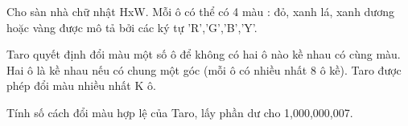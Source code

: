 Cho sàn nhà chữ nhật HxW. Mỗi ô có thể có 4 màu : đỏ, xanh lá, xanh dương hoặc vàng được mô tả bởi các ký tự 'R','G','B','Y'.  

   Taro quyết định đổi màu một số ô để không có hai ô nào kề nhau có cùng màu. Hai ô là kề nhau nếu có chung một góc (mỗi ô có nhiều nhất 8 ô kề). Taro được phép đổi màu nhiều nhất K ô.  

   Tính số cách đổi màu hợp lệ của Taro, lấy phần dư cho 1,000,000,007.